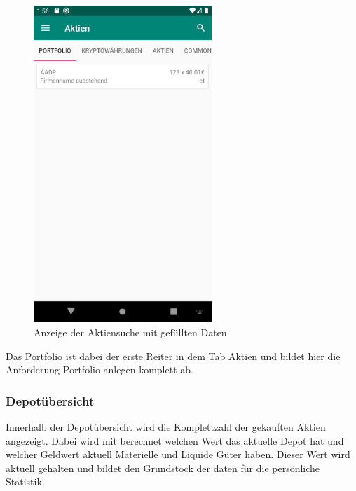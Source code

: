 \documentclass[10pt]{scrartcl}
\begin{document}
\begin{figure}[H]
	\centering
	\includegraphics[width=0.6\textwidth]{Bilder/Prsi/Portfolio.png}
	\caption{Anzeige der Aktiensuche mit gefüllten Daten}
\end{figure}

Das Portfolio ist dabei der erste Reiter in dem Tab Aktien und bildet hier die Anforderung Portfolio anlegen komplett ab.

\subsubsection{Depotübersicht}

Innerhalb der Depotübersicht wird die Komplettzahl der gekauften Aktien angezeigt. Dabei wird mit berechnet welchen Wert das aktuelle Depot hat und welcher Geldwert aktuell Materielle und Liquide Güter haben. Dieser Wert wird aktuell gehalten und bildet den Grundstock der daten für die persönliche Statistik.
\end{document}
